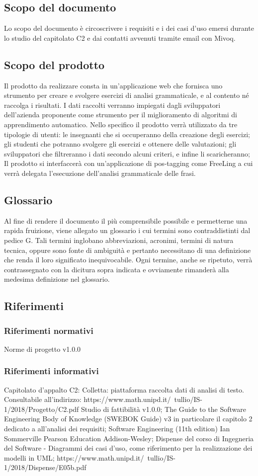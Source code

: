 \subsection{Scopo del documento}
Lo scopo del documento è circoscrivere i requisiti e i dei casi d’uso emersi durante lo studio del capitolato C2 e dai contatti avvenuti tramite email con Mivoq.
\subsection{Scopo del prodotto}
Il prodotto da realizzare consta in un’applicazione web che fornisca uno strumento per creare e svolgere esercizi di analisi grammaticale, e al contento né raccolga i risultati. I dati raccolti verranno impiegati dagli sviluppatori dell’azienda proponente come strumento per il miglioramento di algoritmi di apprendimento automatico. Nello specifico il prodotto verrà utilizzato da tre tipologie di utenti:
le insegnanti che si occuperanno della creazione degli esercizi;
gli studenti che potranno svolgere gli esercizi e ottenere delle valutazioni; 
gli sviluppatori che filtreranno i dati secondo alcuni criteri, e infine li scaricheranno;\\Il prodotto si interfaccerà con un’applicazione di pos-tagging come FreeLing a cui verrà delegata l’esecuzione dell’analisi grammaticale delle frasi.
\subsection{Glossario}
Al fine di rendere il documento il più comprensibile possibile e permetterne una rapida fruizione, viene allegato un glossario i cui termini sono contraddistinti dal pedice G. Tali termini inglobano abbreviazioni, acronimi, termini di natura tecnica, oppure sono fonte di ambiguità e pertanto necessitano di una definizione che renda il loro significato inequivocabile. 
Ogni termine, anche se ripetuto, verrà contrassegnato con la dicitura sopra indicata e ovviamente rimanderà alla medesima definizione nel glossario.
\subsection{Riferimenti}
\subsubsection{Riferimenti normativi}
Norme di progetto v1.0.0
\subsubsection{Riferimenti informativi}
Capitolato d’appalto C2: Colletta: piattaforma raccolta dati di analisi di testo. Consultabile all’indirizzo:
https://www.math.unipd.it/~tullio/IS-1/2018/Progetto/C2.pdf
Studio di fattibilità v1.0.0;
The Guide to the Software Engineering Body of Knowledge (SWEBOK Guide) v3 in particolare il capitolo 2 dedicato a all’analisi dei requisiti;
Software Engineering (11th edition) Ian Sommerville Pearson Education Addison-Wesley; 
Dispense del corso di Ingegneria del Software - Diagrammi dei casi d’uso, come riferimento per la realizzazione dei modelli in UML;
https://www.math.unipd.it/~tullio/IS-1/2018/Dispense/E05b.pdf

